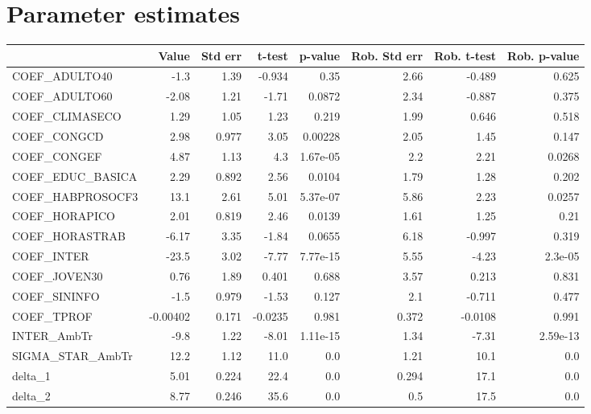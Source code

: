 \section{Parameter estimates}
\begin{tabular}{lrrrrrrr}
\toprule
{} &    Value &  Std err &  t-test &  p-value &  Rob. Std err &  Rob. t-test &  Rob. p-value \\
\midrule
COEF\_ADULTO40    &     -1.3 &     1.39 &  -0.934 &     0.35 &          2.66 &       -0.489 &         0.625 \\
COEF\_ADULTO60    &    -2.08 &     1.21 &   -1.71 &   0.0872 &          2.34 &       -0.887 &         0.375 \\
COEF\_CLIMASECO   &     1.29 &     1.05 &    1.23 &    0.219 &          1.99 &        0.646 &         0.518 \\
COEF\_CONGCD      &     2.98 &    0.977 &    3.05 &  0.00228 &          2.05 &         1.45 &         0.147 \\
COEF\_CONGEF      &     4.87 &     1.13 &     4.3 & 1.67e-05 &           2.2 &         2.21 &        0.0268 \\
COEF\_EDUC\_BASICA &     2.29 &    0.892 &    2.56 &   0.0104 &          1.79 &         1.28 &         0.202 \\
COEF\_HABPROSOCF3 &     13.1 &     2.61 &    5.01 & 5.37e-07 &          5.86 &         2.23 &        0.0257 \\
COEF\_HORAPICO    &     2.01 &    0.819 &    2.46 &   0.0139 &          1.61 &         1.25 &          0.21 \\
COEF\_HORASTRAB   &    -6.17 &     3.35 &   -1.84 &   0.0655 &          6.18 &       -0.997 &         0.319 \\
COEF\_INTER       &    -23.5 &     3.02 &   -7.77 & 7.77e-15 &          5.55 &        -4.23 &       2.3e-05 \\
COEF\_JOVEN30     &     0.76 &     1.89 &   0.401 &    0.688 &          3.57 &        0.213 &         0.831 \\
COEF\_SININFO     &     -1.5 &    0.979 &   -1.53 &    0.127 &           2.1 &       -0.711 &         0.477 \\
COEF\_TPROF       & -0.00402 &    0.171 & -0.0235 &    0.981 &         0.372 &      -0.0108 &         0.991 \\
INTER\_AmbTr      &     -9.8 &     1.22 &   -8.01 & 1.11e-15 &          1.34 &        -7.31 &      2.59e-13 \\
SIGMA\_STAR\_AmbTr &     12.2 &     1.12 &    11.0 &      0.0 &          1.21 &         10.1 &           0.0 \\
delta\_1          &     5.01 &    0.224 &    22.4 &      0.0 &         0.294 &         17.1 &           0.0 \\
delta\_2          &     8.77 &    0.246 &    35.6 &      0.0 &           0.5 &         17.5 &           0.0 \\
\bottomrule
\end{tabular}

